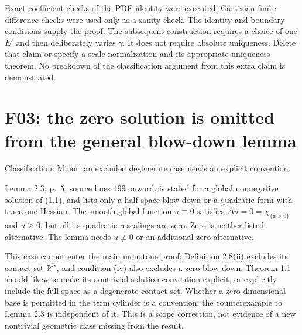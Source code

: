 \documentclass[10pt]{article}
\begin{document}
Exact coefficient checks of the PDE identity were executed; Cartesian finite-difference checks were used only as a sanity check. The identity and boundary conditions supply the proof. The subsequent construction requires a choice of one \(E'\) and then deliberately varies \(\gamma\). It does not require absolute uniqueness. Delete that claim or specify a scale normalization and its appropriate uniqueness theorem. No breakdown of the classification argument from this extra claim is demonstrated.\par
\section*{F03: the zero solution is omitted from the general blow-down lemma}
Classification: Minor; an excluded degenerate case needs an explicit convention.\par
Lemma 2.3, p. 5, source lines 499 onward, is stated for a global nonnegative solution of (1.1), and lists only a half-space blow-down or a quadratic form with trace-one Hessian. The smooth global function \(u\equiv0\) satisfies \(\Delta u=0=\chi_{\{u>0\}}\) and \(u\geq0\), but all its quadratic rescalings are zero. Zero is neither listed alternative. The lemma needs \(u\not\equiv0\) or an additional zero alternative.\par
This case cannot enter the main monotone proof: Definition 2.8(ii) excludes its contact set \(\mathbb R^N\), and condition (iv) also excludes a zero blow-down. Theorem 1.1 should likewise make its nontrivial-solution convention explicit, or explicitly include the full space as a degenerate contact set. Whether a zero-dimensional base is permitted in the term cylinder is a convention; the counterexample to Lemma 2.3 is independent of it. This is a scope correction, not evidence of a new nontrivial geometric class missing from the result.\par
\end{document}
